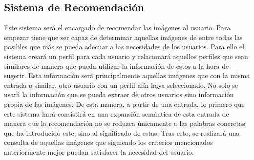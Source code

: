 \subsection{Sistema de Recomendación}
Este sistema será el encargado de recomendar las imágenes al usuario. Para empezar tiene que ser capaz de determinar aquellas imágenes de entre todas las posibles que más se pueda adecuar a las necesidades de los usuarios. Para ello el sistema creará un perfil para cada usuario y relacionará aquellos perfiles que sean similares de manera que pueda utilizar la información de estos a la hora de sugerir. Esta información será principalmente aquellas imágenes que con la misma entrada o similar, otro usuario con un perfil afín haya seleccionado. No solo se usará la información que se pueda extraer de otros usuarios sino información propia de las imágenes. De esta manera, a partir de una entrada, lo primero que este sistema hará consistirá en una expansión semántica de esta entrada de manera que la recomendación no se reduzca únicamente a las palabras concretas que ha introducido este, sino al significado de estas. Tras esto, se realizará una consulta de aquellas imágenes que siguiendo los criterios mencionados anteriormente mejor puedan satisfacer la necesidad del usuario.






